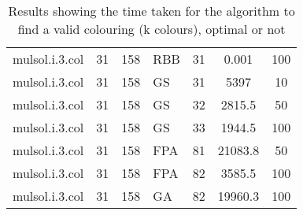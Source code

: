 \begin{table}[H]
\begin{tabular}{|l c c l c c c|}
mulsol.i.3.col & 31 & 158 & RBB & 31 & 0.001 & 100\\
mulsol.i.3.col & 31 & 158 & GS  & 31 & 5397 & 10\\
mulsol.i.3.col & 31 & 158 & GS  & 32 & 2815.5 & 50\\
mulsol.i.3.col & 31 & 158 & GS  & 33 & 1944.5 & 100\\
mulsol.i.3.col & 31 & 158 & FPA & 81 & 21083.8 & 50\\
mulsol.i.3.col & 31 & 158 & FPA & 82 & 3585.5 & 100\\
mulsol.i.3.col & 31 & 158 & GA  & 82 & 19960.3 & 100\\ \hline
\end{tabular}
\caption{Results showing the time taken for the algorithm to find a valid colouring (k colours), optimal or not}
\label{res:timeToK}
\end{table}

